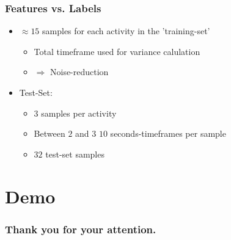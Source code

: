 \documentclass[aspectratio=169]{beamer}
\begin{document}
\begin{frame}
	\frametitle{Features vs. Labels}
	\begin{itemize}
		\item $\approx 15$ samples for each activity in the 'training-set'
		\begin{itemize}
			\item Total timeframe used for variance calulation
			\item $\Rightarrow$ Noise-reduction
		\end{itemize}
		\item Test-Set:
		\begin{itemize}
			\item $3$ samples per activity
			\item Between $2$ and $3$ $10$ seconds-timeframes per sample
			\item $32$ test-set samples
		\end{itemize}
	\end{itemize}
\end{frame}

\section{Demo}

\begin{frame}
	\frametitle{Thank you for your attention.}
\end{frame}

\end{document}
